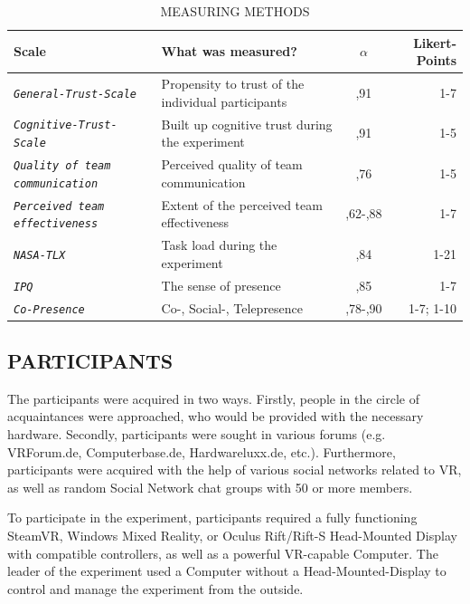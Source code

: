 \documentclass[sigchi]{acmart}
\begin{document}
\begin{table}
  \caption{MEASURING METHODS}
  \label{questionnaires}
  \begin{tabular}{llcr}
    \toprule
    Scale & What was measured? & $\alpha$ & Likert-Points \\
    \midrule
    \texttt{\textit{General-Trust-Scale} \citep{couch1996assessment}} & Propensity to trust of the individual participants & ,91 & 1-7 \\
    
    \texttt{\textit{Cognitive-Trust-Scale} \citep{mcallister1995affect}} & Built up cognitive trust during the experiment & ,91 & 1-5\\
    
     \texttt{\textit{Quality of team communication} \citep{gonzalez2014climate}} & Perceived quality of team communication & ,76 & 1-5 \\
     
      \texttt{\textit{Perceived team effectiveness} \citep{gibson2003team}} & Extent of the perceived team effectiveness & ,62-,88 & 1-7\\
          
       \texttt{\textit{NASA-TLX} \citep{NASATLX}} & Task load during the experiment & ,84 &1-21  \\
       
       \texttt{\textit{IPQ} \citep{IPQ}} & The sense of presence & ,85 & 1-7 \\
       
        \texttt{\textit{Co-Presence} \citep{nowak2003effect}} &  Co-, Social-, Telepresence & ,78-,90 & 1-7; 1-10 \\
    \bottomrule
  \end{tabular}
\end{table}

\subsection{PARTICIPANTS}

The participants were acquired in two ways. Firstly, people in the circle of acquaintances were approached, who would be provided with the necessary hardware. Secondly, participants were sought in various forums (e.g. VRForum.de, Computerbase.de, Hardwareluxx.de, etc.). Furthermore, participants were acquired with the help of various social networks related to VR, as well as random Social Network chat groups with 50 or more members.

To participate in the experiment, participants required a fully functioning SteamVR, Windows Mixed Reality, or Oculus Rift/Rift-S Head-Mounted Display with compatible controllers, as well as a powerful VR-capable Computer. The leader of the experiment used a Computer without a Head-Mounted-Display to control and manage the experiment from the outside.
\end{document}
